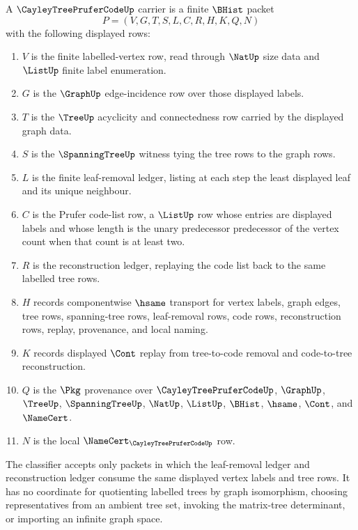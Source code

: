 \begin{definition}
\label{def:cayley-tree-prufer-code-carrier}
A $\CayleyTreePruferCodeUp$ carrier is a finite $\BHist$ packet
$$
P=(V,G,T,S,L,C,R,H,K,Q,N)
$$
with the following displayed rows:
\begin{enumerate}
\item $V$ is the finite labelled-vertex row, read through $\NatUp$ size data and $\ListUp$ finite label enumeration.
\item $G$ is the $\GraphUp$ edge-incidence row over those displayed labels.
\item $T$ is the $\TreeUp$ acyclicity and connectedness row carried by the displayed graph data.
\item $S$ is the $\SpanningTreeUp$ witness tying the tree rows to the graph rows.
\item $L$ is the finite leaf-removal ledger, listing at each step the least displayed leaf and its unique neighbour.
\item $C$ is the Prufer code-list row, a $\ListUp$ row whose entries are displayed labels and whose length is the unary predecessor predecessor of the vertex count when that count is at least two.
\item $R$ is the reconstruction ledger, replaying the code list back to the same labelled tree rows.
\item $H$ records componentwise $\hsame$ transport for vertex labels, graph edges, tree rows, spanning-tree rows, leaf-removal rows, code rows, reconstruction rows, replay, provenance, and local naming.
\item $K$ records displayed $\Cont$ replay from tree-to-code removal and code-to-tree reconstruction.
\item $Q$ is the $\Pkg$ provenance over $\CayleyTreePruferCodeUp$, $\GraphUp$, $\TreeUp$, $\SpanningTreeUp$, $\NatUp$, $\ListUp$, $\BHist$, $\hsame$, $\Cont$, and $\NameCert$.
\item $N$ is the local $\NameCert_{\CayleyTreePruferCodeUp}$ row.
\end{enumerate}
The classifier accepts only packets in which the leaf-removal ledger and reconstruction ledger consume the same displayed vertex labels and tree rows. It has no coordinate for quotienting labelled trees by graph isomorphism, choosing representatives from an ambient tree set, invoking the matrix-tree determinant, or importing an infinite graph space.
\end{definition}

